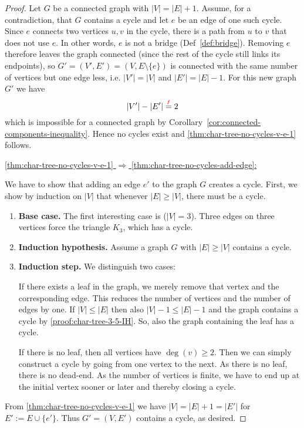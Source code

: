 \begin{proof}
Let \(G\) be a connected graph with \(|V|=|E|+1\).
Assume, for a contradiction, that \(G\) contains a cycle and let \(e\) be an edge of one such cycle.
Since \(e\) connects two vertices \(u,v\) in the cycle, there is a path from \(u\) to \(v\) that does not use \(e\).
In other words, \(e\) is not a bridge (Def~\ref{def:bridge}).
Removing \(e\) therefore leaves the graph connected (since the rest of the cycle still links its endpoints), so \(G'=(V',E')=(V,E\setminus\{e\})\) is connected with the same number of vertices but one edge less, i.e. \(|V'|=|V|\) and \(|E'|=|E|-1\). 
For this new graph \(G'\) we have
\[
|V'| - |E'| \overset{\text{\textcolor{red}{\Lightning}}}{=} 2
\]
which is impossible for a connected graph by Corollary~\ref{cor:connected-components-inequality}.  
Hence no cycles exist and \ref{thm:char-tree-no-cycles-v-e-1} follows.

\hypertarget{proof:char-tree-3-5}{
\underline{\ref{thm:char-tree-no-cycles-v-e-1} $\Rightarrow$
          \ref{thm:char-tree-no-cycles-add-edge}:}}

We have to show that adding an edge \(e'\) to the graph \(G\) creates a cycle.
First, we show by induction on \(|V|\) that whenever \(|E|\ge |V|\), there must be a cycle.

\begin{enumerate}[partopsep=0em, topsep=0em, label=(\roman*)]
\item \textbf{Base case.}
The first interesting case is (\(|V|=3\)).
Three edges on three vertices force the triangle \(K_3\), which has a cycle. \textcolor{Green}{}
\item \textbf{Induction hypothesis.}
Assume a graph \(G\) with \(|E| \geq |V|\) contains a cycle.
\label{proof:char-tree-3-5-IH}
\item \textbf{Induction step.}  
We distinguish two cases:

If there exists a leaf in the graph, we merely remove that vertex and the corresponding edge. 
This reduces the number of vertices and the number of edges by one. 
If $|V| \leq|E|$ then also $|V|-1 \leq|E|-1$ and the graph contains a cycle by \ref{proof:char-tree-3-5-IH}.
So, also the graph containing the leaf has a cycle. \textcolor{Green}{}

If there is no leaf, then all vertices have $\deg(v) \geq 2$. 
Then we can simply construct a cycle by going from one vertex to the next. As there is no leaf, there is no dead-end. 
As the number of vertices is finite, we have to end up at the initial vertex sooner or later and thereby closing a cycle. \textcolor{Green}{}
\end{enumerate}
From \ref{thm:char-tree-no-cycles-v-e-1} we have $|V| = |E| + 1 = |E'|$ for \(E' := E\cup\{e'\}\).
Thus \(G'=(V,E')\) contains a cycle, as desired.


\end{proof}

